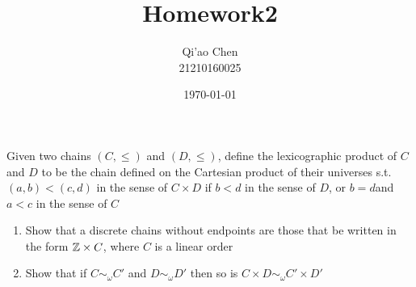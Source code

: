 \documentclass[11pt]{article}
\author{Qi'ao Chen \\21210160025}
\date{\today}
\title{Homework2}
\begin{document}
\maketitle
\begin{exercise}
Given two chains \((C,\le)\) and \((D,\le)\), define the lexicographic product of \(C\) and \(D\) to be
the chain defined on the Cartesian product of their universes s.t. \((a,b)<(c,d)\) in the sense
of \(C\times D\) if \(b<d\) in the sense of \(D\), or \(b=d\)and \(a<c\) in the sense of \(C\)
\begin{enumerate}
\item Show that a discrete chains without endpoints are those that be written in the form \(\mathbb{Z}\times C\),
where \(C\) is a linear order
\item Show that if \(C\sim_\omega C'\) and \(D\sim_\omega D'\) then so is \(C\times D\sim_\omega C'\times D'\)
\end{enumerate}
\end{exercise}
\end{document}
